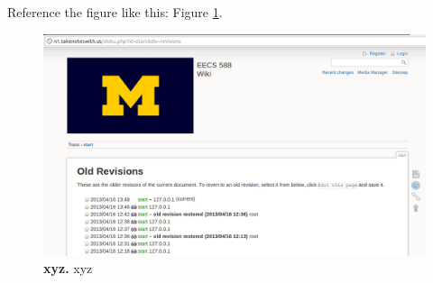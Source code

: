 Reference the figure like this: Figure \ref{fig:oldrevisions}.
\begin{figure}[h]
\centering
\includegraphics[width=0.8\columnwidth]{oldrevisions.png}
\caption{\textbf{xyz.} xyz}
\label{fig:oldrevisions}
\end{figure}

